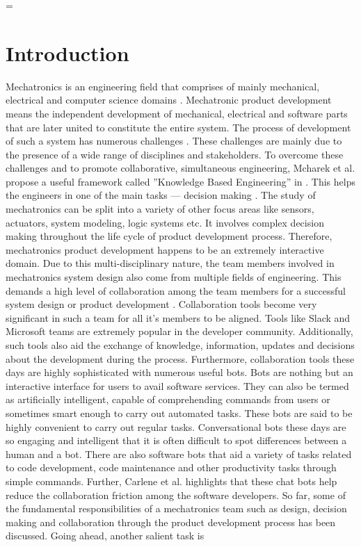 \emergencystretch=\maxdimen
{}

\chapter{Introduction}
\label{chap: into}
Mechatronics is an engineering field that comprises of mainly mechanical, electrical and computer science domains \cite{neumann_mechatronic_nodate}. Mechatronic product development means the independent development of mechanical, electrical and software parts that are later united to constitute the entire system. The process of development of such a system has numerous
challenges \cite{bitzer2016product} \cite{alvarez_cabrera_towards_2010}. These challenges are mainly due to the presence of a wide range of disciplines and stakeholders. To overcome these challenges and to promote collaborative, simultaneous engineering, Mcharek et al. propose a useful framework called ”Knowledge Based Engineering” in \cite{mcharek_knowledge_2018}. This helps the engineers in one of the main tasks — decision making \cite{walden2015}\cite{irshorn2007}. The study of mechatronics can be split into a variety of other focus areas like sensors, actuators, system modeling, logic systems etc. It involves complex decision making throughout the life cycle of product development process\cite{hamida_towards_nodate}. Therefore, mechatronics product development happens to be an extremely interactive domain. Due to this multi-disciplinary nature, the team members involved in mechatronics system design also come from multiple fields of engineering. This demands a high level of collaboration among the team members for a successful system design or product development \cite{neumann_mechatronic_nodate}. Collaboration tools become very significant in such a team for all it’s members to be aligned. Tools like Slack \cite{lin_why_2016} and Microsoft teams \cite{hubbard_mastering_2018} are extremely popular in the developer community. Additionally, such tools also aid the exchange of knowledge, information, updates and decisions about the development during the process. Furthermore, collaboration tools these days are highly sophisticated with numerous useful bots\cite{lebeuf_defining_2019}. Bots are nothing but an interactive interface for users to avail software services. They can also be termed as artificially intelligent, capable of comprehending commands from users or sometimes smart enough to carry out automated tasks. These bots are said to be highly convenient to carry out regular tasks. Conversational bots these days are so engaging and intelligent that it is often difficult to spot differences between a human and a bot\cite{muresan_chats_2019}. There are also software bots  that aid a variety of tasks related to code development, code maintenance and other productivity tasks through simple commands. Further, Carlene et al. highlights that these chat bots help reduce the collaboration friction among the software developers\cite{lebeuf_how_nodate}. So far, some of the fundamental responsibilities of a mechatronics team such as design, decision making and collaboration through the product development process has been discussed. Going ahead, another salient task is 